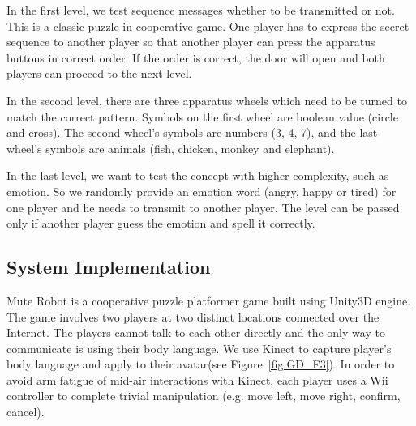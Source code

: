 In the first level, we test sequence messages whether to be transmitted or not. This is a classic puzzle in cooperative game. One player has to express the secret sequence to another player so that another player can press the apparatus buttons in correct order. If the order is correct, the door will open and both players can proceed to the next level.


In the second level, there are three apparatus wheels which need to be turned to match the correct pattern. Symbols on the first wheel are boolean value (circle and cross). The second wheel's symbols are numbers (3, 4, 7), and the last wheel's symbols are animals (fish, chicken, monkey and elephant).


In the last level, we want to test the concept with higher complexity, such as emotion. So we randomly provide an emotion word (angry, happy or tired) for one player and he needs to transmit to another player. The level can be passed only if another player guess the emotion and spell it correctly.

\subsection{System Implementation}


Mute Robot is a cooperative puzzle platformer game built using Unity3D\cite{GD4} engine. The game involves two players at two distinct locations connected over the Internet. The players cannot talk to each other directly and the only way to communicate is using their body language. We use Kinect to capture player's body language and apply to their avatar(see Figure~\ref{fig:GD_F3}). In order to avoid arm fatigue of mid-air interactions\cite{GD6} with Kinect, each player uses a Wii\cite{GD5} controller to complete trivial manipulation (e.g. move left, move right, confirm, cancel).

